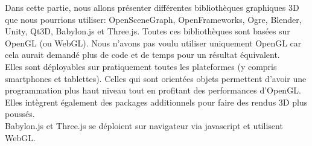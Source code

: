 Dans cette partie, nous allons présenter différentes bibliothèques graphiques 3D que nous pourrions utiliser: OpenSceneGraph, OpenFrameworks, Ogre, Blender, Unity, Qt3D, Babylon.js et Three.js. Toutes ces bibliothèques sont basées sur OpenGL (ou WebGL). Nous n'avons pas voulu utiliser uniquement OpenGL car cela aurait demandé plus de code et de temps pour un résultat équivalent. \\
Elles sont déployables sur pratiquement toutes les plateformes (y compris smartphones et tablettes). Celles qui sont orientées objets permettent d'avoir une programmation plus haut niveau tout en profitant des performances d'OpenGL. Elles intègrent également des packages additionnels pour faire des rendus 3D plus poussés. \\
Babylon.js et Three.js se déploient sur navigateur via javascript et utilisent WebGL.
